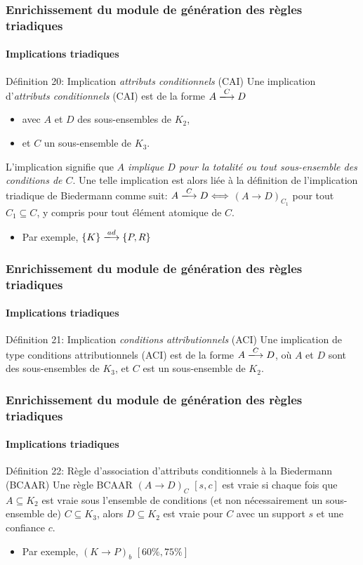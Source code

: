 \documentclass[french]{beamer}
\begin{document}
\begin{frame}
\frametitle{Enrichissement du module de génération des règles triadiques}
\framesubtitle{Implications triadiques \parencite{Ganter2004}}
\begin{block}{Définition 20: Implication \emph{attributs conditionnels} (CAI)}
Une implication d'\emph{attributs conditionnels} (CAI) est de la forme 
$A \xlongrightarrow{C} D$
\begin{itemize}
\item avec $A$ et $D$ des sous-ensembles de $K_2$,
\item et $C$ un sous-ensemble de $K_3$. 
\end{itemize}
L'implication signifie que \emph{$A$ implique $D$ pour la totalité ou tout sous-ensemble des conditions de $C$}. Une telle implication est alors liée à la définition de l'implication triadique de Biedermann comme suit: $A \xlongrightarrow{C} D \Longleftrightarrow$  $(A \rightarrow D)_{C_1}$ pour tout $C_1 \subseteq C$, y compris pour tout élément atomique de $C$. 
\end{block}
\begin{itemize}
  \item Par exemple, $\{K\} \xlongrightarrow{ad} \{P,R\}$
\end{itemize}
\end{frame}
\begin{frame}
\frametitle{Enrichissement du module de génération des règles triadiques}
\framesubtitle{Implications triadiques \parencite{Ganter2004}}
\begin{block}{Définition 21: Implication \emph{conditions attributionnels} (ACI)}
Une implication de type conditions attributionnels (ACI) est de la forme $A \xlongrightarrow{C} D$, où $A$ et $D$ sont des sous-ensembles de $K_3$, et $C$ est un sous-ensemble de $K_2$.
\end{block}
\end{frame}
\begin{frame}
\frametitle{Enrichissement du module de génération des règles triadiques}
\framesubtitle{Implications triadiques \parencite{Ganter2004}}
\begin{block}{Définition 22: Règle d'association d'attributs conditionnels à la Biedermann (BCAAR)}
Une règle BCAAR $(A \rightarrow D)_C$ $[s, c]$ est vraie si chaque fois que $A \subseteq K_2$ est vraie sous l'ensemble de conditions (et non nécessairement un sous-ensemble de) $C \subseteq K_3$, alors $D \subseteq K_2$ est vraie pour $C$ avec un support $s$ et une confiance $c$.
\end{block}
\begin{itemize}
  \item Par exemple, $(K \rightarrow P)_b$ $[60\%, 75\%]$
\end{itemize}
\end{frame}
\end{document}
